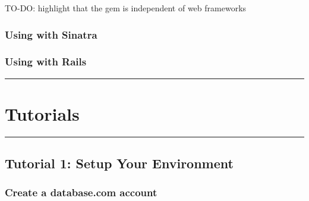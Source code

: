 \documentclass{article}
\begin{document}
TO-DO: highlight that the gem is independent of web frameworks

\hypertarget{using_with_sinatra}{}\subsubsection*{{Using with Sinatra}}\label{using_with_sinatra}

\hypertarget{using_with_rails}{}\subsubsection*{{Using with Rails}}\label{using_with_rails}


\vspace{.5em} \hrule \vspace{.5em}
\hypertarget{tutorials}{}\section*{{Tutorials}}\label{tutorials}


\vspace{.5em} \hrule \vspace{.5em}
\hypertarget{tutorial_1_setup_your_environment}{}\subsection*{{Tutorial 1: Setup Your Environment}}\label{tutorial_1_setup_your_environment}

\hypertarget{create_a_databasecom_account}{}\subsubsection*{{Create a database.com account}}\label{create_a_databasecom_account}
\end{document}
